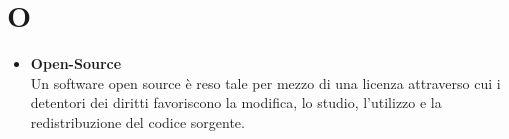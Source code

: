 \chapter{O} \label{O}
\begin{itemize}
	\item \textbf{Open-Source} \\
	Un software open source è reso tale per mezzo di una licenza attraverso cui i detentori dei diritti favoriscono la modifica, lo studio, l'utilizzo e la redistribuzione del codice sorgente.
\end{itemize}